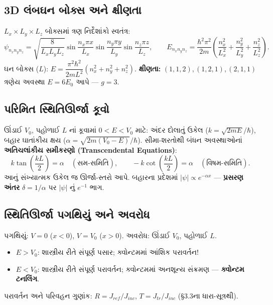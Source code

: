 \subsection{3D લંબઘન બોક્સ અને ક્ષીણતા }
$L_x\times L_y\times L_z$ બોક્સમાં ત્રણ નિર્દેશાંકો સ્વતંત્ર:
\[
\psi_{n_xn_yn_z}=\sqrt{\frac{8}{L_xL_yL_z}}\sin\frac{n_x\pi x}{L_x}\sin\frac{n_y\pi y}{L_y}\sin\frac{n_z\pi z}{L_z},
\qquad
E_{n_xn_yn_z}=\frac{\hbar^{2}\pi^{2}}{2m}\left(\frac{n_x^{2}}{L_x^{2}}+\frac{n_y^{2}}{L_y^{2}}+\frac{n_z^{2}}{L_z^{2}}\right).
\]
ઘન બોક્સ ($L$): $E=\dfrac{\pi^{2}\hbar^{2}}{2mL^{2}}(n_x^{2}+n_y^{2}+n_z^{2})$. \textbf{ક્ષીણતા:} $(1,1,2),(1,2,1),(2,1,1)$ ત્રણેય અવસ્થા $E=6E_0$ આપે — $g=3$.

\subsection{પરિમિત સ્થિતિઊર્જા કૂવો }
ઊંડાઈ $V_0$, પહોળાઈ $L$ નાં કૂવામાં $0<E<V_0$ માટે: અંદર દોલાતું ઉકેલ ($k=\sqrt{2mE}/\hbar$), બહાર ઘાતાંકીય ક્ષય ($\alpha=\sqrt{2m(V_0-E)}/\hbar$). સીમા-શરતોથી બંધન અવસ્થાઓનાં \textbf{અતિચલાંકીય સમીકરણો (Transcendental Equations)}:
\begin{equation}
k\tan\!\left(\frac{kL}{2}\right)=\alpha\quad(\text{સમ-સમિતિ}),\qquad
-k\cot\!\left(\frac{kL}{2}\right)=\alpha\quad(\text{વિષમ-સમિતિ}).
\label{eq:transcendental}
\end{equation}
આનું સંખ્યાત્મક ઉકેલ જ ઊર્જા-સ્તરો આપે. બહારના પ્રદેશમાં $|\psi|\propto e^{-\alpha x}$ — \textbf{પ્રસરણ અંતર} $\delta=1/\alpha$ પર $|\psi|$ નું $e^{-1}$ ભાગ.

\subsection{સ્થિતિઊર્જા પગથિયું અને અવરોધ }
પગથિયું: $V=0$ ($x<0$), $V=V_0$ ($x>0$). અવરોધ: ઊંડાઈ $V_0$, પહોળાઈ $L$.
\begin{itemize}[itemsep=2pt]
  \item $E>V_0$: શાસ્ત્રીય રીતે સંપૂર્ણ પસાર; ક્વોન્ટમમાં આંશિક પરાવર્તન!
  \item $E<V_0$: શાસ્ત્રીય રીતે સંપૂર્ણ પરાવર્તન; ક્વોન્ટમમાં અનશૂન્ય સંક્રમણ — \textbf{ક્વોન્ટમ ટનલિંગ}.
\end{itemize}
પરાવર્તન અને પરિવહન ગુણાંક: $R=J_{ref}/J_{inc}$, $T=J_{tr}/J_{inc}$ (\S3.3ના ધારા-સૂત્રથી).

